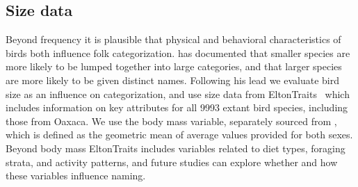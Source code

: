 \documentclass[10pt,letterpaper]{article}
\begin{document}
\subsection{Size data}
Beyond frequency it is plausible that physical and behavioral characteristics of birds both influence folk categorization.  has documented that smaller species are more likely to be lumped together into large categories, and that larger species are more likely to be given distinct names. Following his lead we evaluate bird size as an influence on categorization, and use size data from EltonTraits~\cite{wilman2014eltontraits} which includes information on key attributes for all 9993 extant bird species, including those from Oaxaca.  We use the body mass variable, separately sourced from \cite{dunning2007crc}, which is defined as the geometric mean of average values provided for both sexes. Beyond body mass EltonTraits includes variables related to diet types, foraging strata, and activity patterns, and future studies can explore whether and how these variables influence naming. 

%
%
\end{document}
